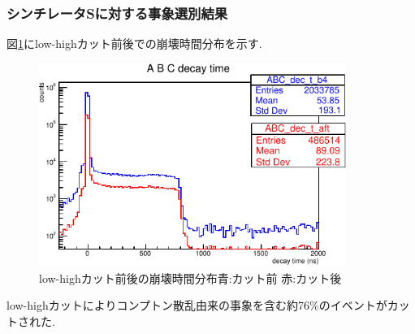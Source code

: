 \subsubsection{シンチレータSに対する事象選別結果}
図\ref{fig:dec_t_cut}にlow-highカット前後での崩壊時間分布を示す.
\begin{figure}[H]
	\centering
		\includegraphics[width=10cm]{fig/isb/decay_t_cut.pdf}
		\caption{low-highカット前後の崩壊時間分布\newline 青:カット前 赤:カット後}
		\label{fig:dec_t_cut}
\end{figure}
low-highカットによりコンプトン散乱由来の事象を含む約76\%のイベントがカットされた.

